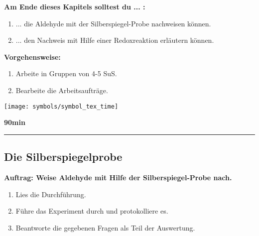 \documentclass{scrartcl}  %
\begin{document}
			\begin{minipage}{0.7\textwidth}
				\noindent \textbf{Am Ende dieses Kapitels solltest du ... :}
				\begin{enumerate}
					\item ... die Aldehyde mit der Silberspiegel-Probe nachweisen können.
					\item ... den Nachweis mit Hilfe einer Redoxreaktion erläutern können. 
				\end{enumerate}	
				
				\noindent \textbf{Vorgehensweise:}
				\begin{enumerate}
					\item Arbeite in Gruppen von 4-5 SuS.
					\item Bearbeite die Arbeitsaufträge.
				\end{enumerate}	
			\end{minipage}
			\hspace{0.1\textwidth}
			\begin{minipage}{0.2\textwidth}
				\begin{tcolorbox}
					[enhanced,
					width=0.9\textwidth,
					colback=white,
					colframe=black,
					fonttitle=\sffamily\bfseries\large, 
					title=Zeit,  %
					attach boxed title to top center={xshift=-0.0mm,yshift=-0.50mm},
					boxed title style={skin=enhancedfirst jigsaw,size=small,arc=1mm,bottom=-1mm,colframe=black,height=0.75cm},
					colbacktitle=black,
					drop lifted shadow]
					\centering
					\texttt{[image: symbols/symbol\_tex\_time]}
					
					\begin{center}
						\textbf{90min}
					\end{center}
				\end{tcolorbox}
			\end{minipage}
			
			\begin{center}
				\noindent\rule{18cm}{0.1pt}
			\end{center}
\newpage
		
		\subsection{Die Silberspiegelprobe}
	
			\noindent \textbf{Auftrag: Weise Aldehyde mit Hilfe der Silberspiegel-Probe nach.}
			\begin{enumerate}
				\item Lies die Durchführung.
				\item Führe das Experiment durch und protokolliere es.
				\item Beantworte die gegebenen Fragen als Teil der Auswertung.
			\end{enumerate}
			
\end{document}
